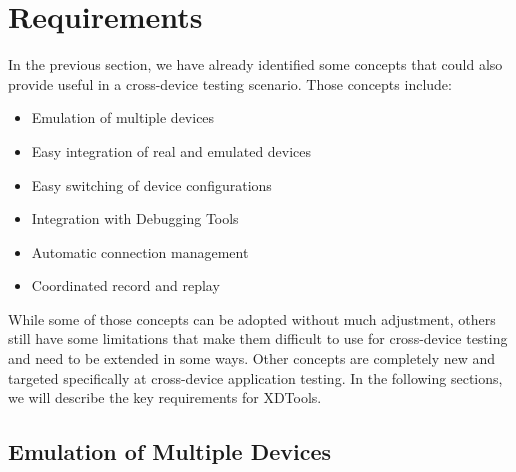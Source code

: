 \chapter{Requirements}

In the previous section, we have already identified some concepts that could also provide useful in a cross-device testing scenario. Those concepts include:
\begin{itemize}
	\item Emulation of multiple devices
	\item Easy integration of real and emulated devices
	\item Easy switching of device configurations
	\item Integration with Debugging Tools
	\item Automatic connection management
	\item Coordinated record and replay
\end{itemize}

While some of those concepts can be adopted without much adjustment, others still have some limitations that make them difficult to use for cross-device testing and need to be extended in some ways. Other concepts are completely new and targeted specifically at cross-device application testing. In the following sections, we will describe the key requirements for XDTools.

\section{Emulation of Multiple Devices}


